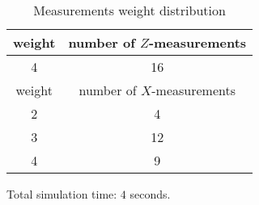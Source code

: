 \documentclass[12pt]{article}
\begin{document}
\begin{table}[h]
\centering
\begin{tabular}{c c}
\hline
weight & number of $Z$-measurements\\
\hline
4 & 16\\
\hline
\hline
weight & number of $X$-measurements\\
\hline
2 & 4\\
3 & 12\\
4 & 9\\
\hline
\end{tabular}
\caption{Measurements weight distribution}
\end{table}
\vspace{.3cm}



\vspace{2cm}
Total simulation time: $4$ seconds.
\end{document}
